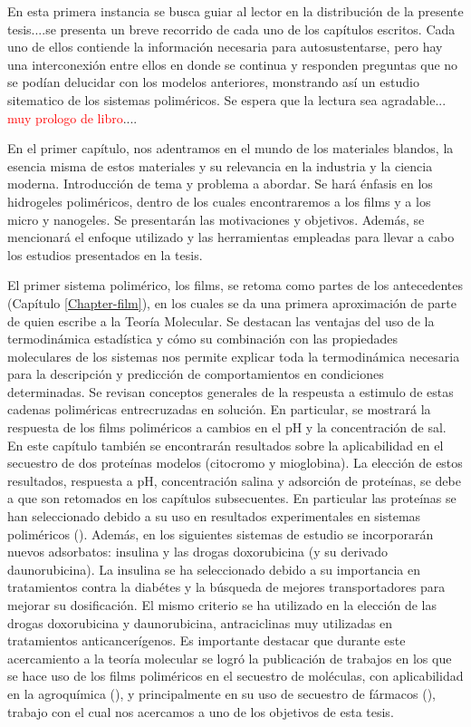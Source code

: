 \label{ruta}

 
En esta primera instancia se busca guiar al lector en la distribuci\'on de la presente tesis....se presenta un breve recorrido de cada uno de los cap\'itulos escritos.
Cada uno de ellos contiende la informaci\'on necesaria para autosustentarse, pero hay una interconexi\'on entre ellos en donde se continua y responden preguntas que no se pod\'ian delucidar con los modelos anteriores, monstrando as\'i un estudio sitematico de los sistemas polim\'ericos.
Se espera que la lectura sea agradable... \textcolor{red}{muy prologo de libro}....

En el primer cap\'itulo, nos adentramos en el mundo de los materiales blandos, la esencia misma de estos materiales y su relevancia en la industria y la ciencia moderna. Introducción de tema y problema a abordar.  Se har\'a \'enfasis en los hidrogeles polim\'ericos, dentro de los cuales encontraremos a los films y a los micro y nanogeles. Se presentar\'an las motivaciones y objetivos. Adem\'as, se mencionar\'a el enfoque utilizado y las herramientas empleadas para llevar a cabo los estudios presentados en la tesis.

El primer sistema polim\'erico, los films, se retoma como partes de los antecedentes (Cap\'itulo \ref{Chapter-film}), en los cuales se da una primera aproximaci\'on de parte de quien escribe a la Teor\'ia Molecular. Se destacan las ventajas del uso de la termodin\'amica estad\'istica y c\'omo su combinaci\'on con las propiedades moleculares de los sistemas nos permite explicar toda la termodin\'amica necesaria para la descripci\'on y predicci\'on de comportamientos en condiciones determinadas. Se revisan conceptos generales de la respeusta a estimulo de estas cadenas polim\'ericas entrecruzadas en soluci\'on. En particular, se mostrar\'a la respuesta de los films polim\'ericos a cambios en el pH y la concentraci\'on de sal. En este cap\'itulo tambi\'en se encontrar\'an resultados sobre la aplicabilidad en el secuestro de dos prote\'inas modelos (citocromo y mioglobina). La elecci\'on de estos resultados, respuesta a pH, concentraci\'on salina y adsorci\'on de prote\'inas, se debe a que son retomados en los cap\'itulos subsecuentes. En particular las prote\'inas se han seleccionado debido a su uso en resultados experimentales en sistemas polim\'ericos (\addcite). Adem\'as, en los siguientes sistemas de estudio se incorporar\'an nuevos adsorbatos: insulina y las drogas doxorubicina (y su derivado daunorubicina). La insulina se ha seleccionado debido a su importancia en tratamientos contra la diab\'etes y la b\'usqueda de mejores transportadores para mejorar su dosificaci\'on. El mismo criterio se ha utilizado en la elecci\'on de las drogas doxorubicina y daunorubicina, antraciclinas muy utilizadas en tratamientos anticancer\'igenos.
Es importante destacar que durante este acercamiento a la teor\'ia molecular se logr\'o la publicaci\'on de trabajos en los que se hace uso de los films polim\'ericos en el secuestro de mol\'eculas, con aplicabilidad en la agroqu\'imica (), y principalmente en su uso de secuestro de f\'armacos (\addcite[polimainas]), trabajo con el cual nos acercamos a uno de los objetivos de esta tesis. 

